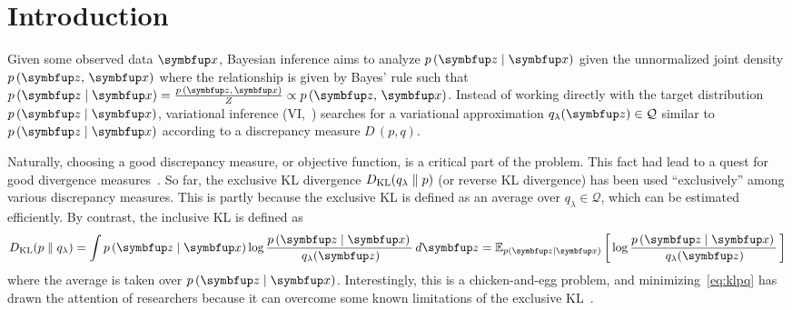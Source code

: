 
\section{Introduction}
Given some observed data \(\vx\), Bayesian inference aims to analyze \(p\,(\vz\mid\vx)\) given the unnormalized joint density \(p\,(\vz,\,\vx)\) where the relationship is given by Bayes' rule such that \(p\,(\vz\mid\vx) = \frac{p\,(\vz,\,\vx)}{Z} \propto p\,(\vz,\,\vx)\).
Instead of working directly with the target distribution \(p\,(\vz\mid\vx)\), variational inference (VI,~\citealt{jordan_introduction_1999, blei_variational_2017, zhang_advances_2019}) searches for a variational approximation \(q_{\lambda}(\vz) \in \mathcal{Q}\) similar to \(p\,(\vz\mid\vx)\) according to a discrepancy measure \(D\,(p, q)\).

Naturally, choosing a good discrepancy measure, or objective function, is a critical part of the problem.
This fact had lead to a quest for good divergence measures~\citep{NIPS2016_7750ca35, NIPS2017_35464c84, NEURIPS2018_1cd138d0, pmlr-v97-ruiz19a}.
So far, the exclusive KL divergence \(D_{\mathrm{KL}}(q_{\lambda}\parallel p)\) (or reverse KL divergence) has been used ``exclusively'' among various discrepancy measures.
This is partly because the exclusive KL is defined as an average over \(q_{\lambda} \in \mathcal{Q}\), which can be estimated efficiently.
By contrast, the inclusive KL is defined as
%
\vspace{-0.02in}
\begin{align}
  \DKL{p}{q_{\lambda}} = \int p\,(\vz\mid\vx) \log \frac{p\,(\vz\mid\vx)\,}{\,q_{\lambda}(\vz)} \,d\vz
  = \Esub{p(\vz\mid\vx)}{\log \frac{p\,(\vz\mid\vx)\,}{\,q_{\lambda}(\vz)} } \label{eq:klpq}
\end{align}
\vspace{-0.02in}
%
where the average is taken over \(p\,(\vz\mid\vx)\). 
Interestingly, this is a chicken-and-egg problem, and minimizing~\eqref{eq:klpq} has drawn the attention of researchers because it can overcome some known limitations of the exclusive KL~\citep{minka2005divergence, mackay_local_2001}.

